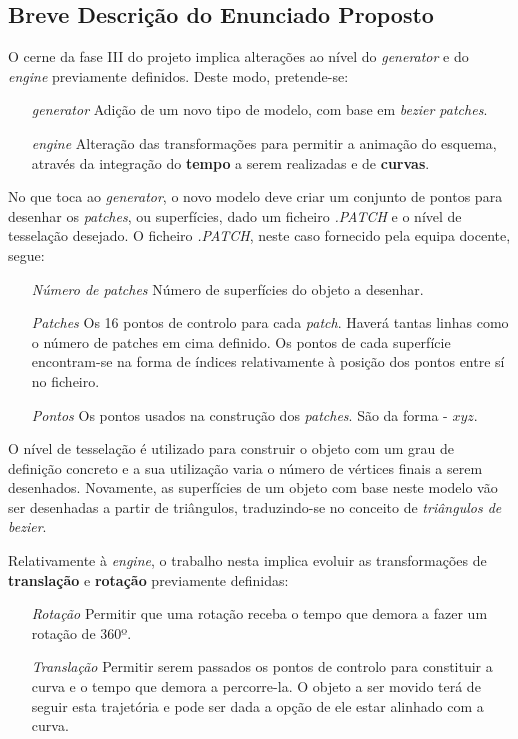 \documentclass[runningheads]{llncs}
\begin{document}
    \subsection{Breve Descrição do Enunciado Proposto}
    
    O cerne da fase III do projeto implica alterações ao nível do \textit{generator} e do \textit{engine} previamente definidos.
    Deste modo, pretende-se:
    \begin{itemize}
        \item [\textit{generator}]{Adição de um novo tipo de modelo, com base em \textit{bezier patches}.}
        \item [\textit{engine}]{Alteração das transformações para permitir a animação do esquema, através da integração do \textbf{tempo} a serem realizadas e de \textbf{curvas}.}
    \end{itemize}
    
    No que toca ao \textit{generator}, o novo modelo deve criar um conjunto de pontos para desenhar os \textit{patches}, ou superfícies, dado um ficheiro \textit{.PATCH} e o nível de tesselação desejado.
    O ficheiro \textit{.PATCH}, neste caso fornecido pela equipa docente, segue:
    \begin{itemize}
        \item [\textit{Número de patches}]{Número de superfícies do objeto a desenhar.}
        \item [\textit{Patches}]{Os 16 pontos de controlo para cada \textit{patch}. Haverá tantas linhas como o número de patches em cima definido. Os pontos de cada superfície encontram-se na forma de índices relativamente à posição dos pontos entre sí no ficheiro.}
        \item [\textit{Pontos}]{Os pontos usados na construção dos \textit{patches}. São da forma - $ x y z $.}
    \end{itemize}
    O nível de tesselação é utilizado para construir o objeto com um grau de definição concreto e a sua utilização varia o número de vértices finais a serem desenhados.
    Novamente, as superfícies de um objeto com base neste modelo vão ser desenhadas a partir de triângulos, traduzindo-se no conceito de \textit{triângulos de bezier}.
    
    Relativamente à \textit{engine}, o trabalho nesta implica evoluir as transformações de \textbf{translação} e \textbf{rotação} previamente definidas:
    \begin{itemize}
        \item [\textit{Rotação}]{Permitir que uma rotação receba o tempo que demora a fazer um rotação de 360º.}
        \item [\textit{Translação}]{Permitir serem passados os pontos de controlo para constituir a curva e o tempo que demora a percorre-la. O objeto a ser movido terá de seguir esta trajetória e pode ser dada a opção de ele estar alinhado com a curva.}
    \end{itemize}
    
\end{document}
